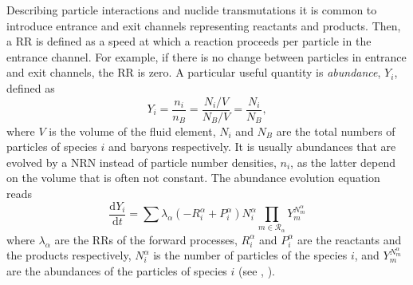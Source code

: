 Describing particle interactions and nuclide transmutations it is 
common to introduce entrance 
and exit channels representing reactants and products. Then, a \ac{RR} 
is defined as a speed at which a reaction proceeds per particle in the 
entrance channel. For example, if there is no change between particles 
in entrance and exit channels, the \ac{RR} is zero. 
%
A particular useful quantity is \textit{abundance}, $Y_i$, defined as 
%
\begin{equation}
\label{eq:theory:nuc:abundance}
Y_i = \frac{n_i}{n_B} = \frac{N_i/V}{N_B/V} = \frac{N_i}{N_B},
\end{equation}
%
where $V$ is the volume of the fluid element, $N_i$ and $N_B$ are the 
total numbers of particles of species $i$ and baryons respectively. 
It is usually abundances that are evolved by a \ac{NRN} instead of 
particle number densities, $n_i$, as the latter depend on the volume that 
is often not constant. 
%
The abundance evolution equation reads
%
\begin{equation}
\frac{\text{d}Y_i}{\text{d}t} = \sum\lambda_{\alpha}(-R_{i}^{\alpha}+P_{i}^{\alpha})N_{i}^{\alpha}\prod_{m\in\mathcal{R}_{\alpha}}Y_m^{N_{m}^{\alpha}}
\end{equation}
%
where $\lambda_{\alpha}$ are the \acp{RR} of the forward processes, 
$R_{i}^{\alpha}$ and $P_{i}^{\alpha}$ are the reactants and the products respectively, 
$N_{i}^{\alpha}$ is the number of particles of the species $i$,  
and $Y_m^{N_{m}^{\alpha}}$ are the abundances of the particles of species $i$ 
(see \eg, \citet{Hix:1999}).

